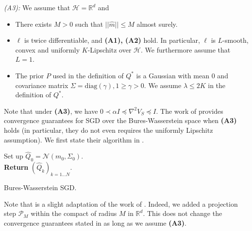 \textit{(A3):} We assume that $\mathcal{H}=\mathbb{R}^d$ and
\begin{itemize}
  \item There exists $M>0$ such that $||\hat{m}|| \leq M$ almost surely.
  \item $\ell$ is twice differentiable, and \textbf{(A1), (A2)} hold. In particular, $\ell$ is $L$-smooth, convex and uniformly $K$-Lipschitz over $\mathcal{H}$. We furthermore assume that $L=1$.
  \item The prior $P$ used in the definition of $Q^*$ is a Gaussian with mean $0$ and covariance matrix $\Sigma= \text{diag}(\gamma), 1\geq\gamma>0$. We assume $\lambda \leq 2K$ in the definition of $Q^*$.
\end{itemize}
Note that under \textbf{(A3)}, we have $0 \prec \alpha I \preceq \nabla^2 V_S \preceq I$.
The work of \citet[Theorem 4]{lambert2022variational} provides convergence guarantees for SGD over the Bures-Wasserstein space when \textbf{(A3)} holds (in particular, they do not even requires the uniformly Lipschitz assumption). We first state their algorithm in .
\begin{algorithm}[ht]
\SetAlgoLined
{}
Set up $\hat{Q}_0 = \mathcal{N}(m_0,\Sigma_0)$. \\
\textbf{Return} $(\hat{Q}_k)_{k=1...N}$.
\caption{Bures-Wasserstein SGD.}
\label{alg: sgd}
\end{algorithm}
Note that  is a slight adaptation of the work of \citet{lambert2022variational}. Indeed, we added a projection step $\mathcal{P}_M$  within the compact of radius $M$ in $\mathbb{R}^d$. This does not change the convergence guarantees stated in  as long as we assume \textbf{(A3)}.

